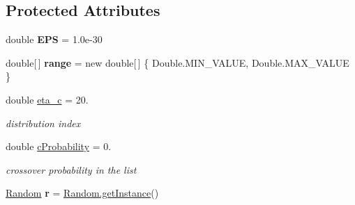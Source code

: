 \subsection*{Protected Attributes}
\begin{DoxyCompactItemize}
\item 
\hypertarget{classcom_1_1msu_1_1moo_1_1operators_1_1crossover_1_1SimulatedBinaryCrossover_a6e8b9e99a9971880417c88e3f9e9cea5}{double {\bfseries E\-P\-S} = 1.\-0e-\/30}\label{classcom_1_1msu_1_1moo_1_1operators_1_1crossover_1_1SimulatedBinaryCrossover_a6e8b9e99a9971880417c88e3f9e9cea5}

\item 
\hypertarget{classcom_1_1msu_1_1moo_1_1operators_1_1crossover_1_1SimulatedBinaryCrossover_a4553b6d3c2b8cbc549e490fbc3a45323}{double\mbox{[}$\,$\mbox{]} {\bfseries range} = new double\mbox{[}$\,$\mbox{]} \{ Double.\-M\-I\-N\-\_\-\-V\-A\-L\-U\-E, Double.\-M\-A\-X\-\_\-\-V\-A\-L\-U\-E \}}\label{classcom_1_1msu_1_1moo_1_1operators_1_1crossover_1_1SimulatedBinaryCrossover_a4553b6d3c2b8cbc549e490fbc3a45323}

\item 
\hypertarget{classcom_1_1msu_1_1moo_1_1operators_1_1crossover_1_1SimulatedBinaryCrossover_af0cddf432a1f07e77a59a334caa267d2}{double \hyperlink{classcom_1_1msu_1_1moo_1_1operators_1_1crossover_1_1SimulatedBinaryCrossover_af0cddf432a1f07e77a59a334caa267d2}{eta\-\_\-c} = 20.}\label{classcom_1_1msu_1_1moo_1_1operators_1_1crossover_1_1SimulatedBinaryCrossover_af0cddf432a1f07e77a59a334caa267d2}

\begin{DoxyCompactList}\small\item\em distribution index \end{DoxyCompactList}\item 
\hypertarget{classcom_1_1msu_1_1moo_1_1operators_1_1crossover_1_1SimulatedBinaryCrossover_ab9b946b17f8129fba3a742ac73429680}{double \hyperlink{classcom_1_1msu_1_1moo_1_1operators_1_1crossover_1_1SimulatedBinaryCrossover_ab9b946b17f8129fba3a742ac73429680}{c\-Probability} = 0.}\label{classcom_1_1msu_1_1moo_1_1operators_1_1crossover_1_1SimulatedBinaryCrossover_ab9b946b17f8129fba3a742ac73429680}

\begin{DoxyCompactList}\small\item\em crossover probability in the list \end{DoxyCompactList}\item 
\hypertarget{classcom_1_1msu_1_1moo_1_1operators_1_1crossover_1_1SimulatedBinaryCrossover_a60baf5b10ddc7bf7fa827ff7dde954a5}{\hyperlink{classcom_1_1msu_1_1moo_1_1util_1_1Random}{Random} {\bfseries r} = \hyperlink{classcom_1_1msu_1_1moo_1_1util_1_1Random_aaa20005ec38b5944262c79c06d92ab62}{Random.\-get\-Instance}()}\label{classcom_1_1msu_1_1moo_1_1operators_1_1crossover_1_1SimulatedBinaryCrossover_a60baf5b10ddc7bf7fa827ff7dde954a5}

\end{DoxyCompactItemize}



